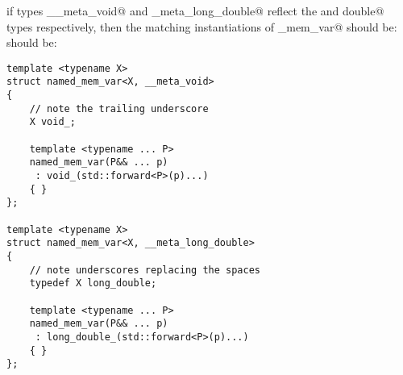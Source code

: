 if types \verb@__meta_void@ and \verb@_meta_long_double@ reflect the \verb@void@ and \verb@long double@
types respectively, then the matching instantiations of \verb@named_mem_var@ should be:
should be:

\begin{verbatim}
template <typename X>
struct named_mem_var<X, __meta_void>
{
	// note the trailing underscore
	X void_;

	template <typename ... P>
	named_mem_var(P&& ... p)
	 : void_(std::forward<P>(p)...)
	{ }
};

template <typename X>
struct named_mem_var<X, __meta_long_double>
{
	// note underscores replacing the spaces
	typedef X long_double;

	template <typename ... P>
	named_mem_var(P&& ... p)
	 : long_double_(std::forward<P>(p)...)
	{ }
};
\end{verbatim}

